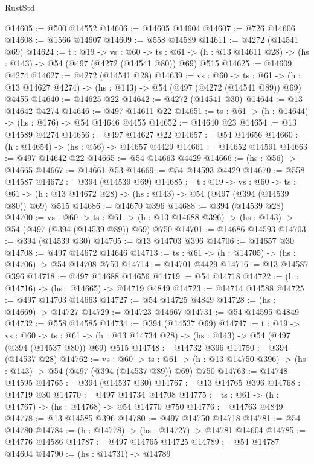\begin{lexlean}{RustStd}
\begin{coremodule}
@14605 := @500 @14552
@14606 := @14605 @14604
@14607 := @726 @14606
@14608 := @1566 @14607
@14609 := @558 @14589
@14611 := @4272 (@14541 @69)
@14624 := {t : @19} ->
  {vs : @60} ->
  {ts : @61} -> (h : @13 @14611 @28) -> (hs : @143) -> @54 (@497 (@4272 (@14541 @80)) @69) @515
@14625 := @14609 @4274
@14627 := @4272 (@14541 @28)
@14639 := {vs : @60} ->
  {ts : @61} -> (h : @13 @14627 @4274) -> (hs : @143) -> @54 (@497 (@4272 (@14541 @89)) @69) @4455
@14640 := @14625 @22
@14642 := @4272 (@14541 @30)
@14644 := @13 @14642 @4274
@14646 := @497 @14611 @22
@14651 := {ts : @61} -> (h : @14644) -> (hs : @176) -> @54 @14646 @4455
@14652 := @14640 @23
@14654 := @13 @14589 @4274
@14656 := @497 @14627 @22
@14657 := @54 @14656
@14660 := (h : @14654) -> (hs : @56) -> @14657 @4429
@14661 := @14652 @14591
@14663 := @497 @14642 @22
@14665 := @54 @14663 @4429
@14666 := (hs : @56) -> @14665
@14667 := @14661 @53
@14669 := @54 @14593 @4429
@14670 := @558 @14587
@14672 := @394 (@14539 @69)
@14685 := {t : @19} ->
  {vs : @60} ->
  {ts : @61} -> (h : @13 @14672 @28) -> (hs : @143) -> @54 (@497 (@394 (@14539 @80)) @69) @515
@14686 := @14670 @396
@14688 := @394 (@14539 @28)
@14700 := {vs : @60} ->
  {ts : @61} -> (h : @13 @14688 @396) -> (hs : @143) -> @54 (@497 (@394 (@14539 @89)) @69) @750
@14701 := @14686 @14593
@14703 := @394 (@14539 @30)
@14705 := @13 @14703 @396
@14706 := @14657 @30
@14708 := @497 @14672 @14646
@14713 := {ts : @61} -> (h : @14705) -> (hs : @14706) -> @54 @14708 @750
@14714 := @14701 @4429
@14716 := @13 @14587 @396
@14718 := @497 @14688 @14656
@14719 := @54 @14718
@14722 := (h : @14716) -> (hs : @14665) -> @14719 @4849
@14723 := @14714 @14588
@14725 := @497 @14703 @14663
@14727 := @54 @14725 @4849
@14728 := (hs : @14669) -> @14727
@14729 := @14723 @14667
@14731 := @54 @14595 @4849
@14732 := @558 @14585
@14734 := @394 (@14537 @69)
@14747 := {t : @19} ->
  {vs : @60} ->
  {ts : @61} -> (h : @13 @14734 @28) -> (hs : @143) -> @54 (@497 (@394 (@14537 @80)) @69) @515
@14748 := @14732 @396
@14750 := @394 (@14537 @28)
@14762 := {vs : @60} ->
  {ts : @61} -> (h : @13 @14750 @396) -> (hs : @143) -> @54 (@497 (@394 (@14537 @89)) @69) @750
@14763 := @14748 @14595
@14765 := @394 (@14537 @30)
@14767 := @13 @14765 @396
@14768 := @14719 @30
@14770 := @497 @14734 @14708
@14775 := {ts : @61} -> (h : @14767) -> (hs : @14768) -> @54 @14770 @750
@14776 := @14763 @4849
@14778 := @13 @14585 @396
@14780 := @497 @14750 @14718
@14781 := @54 @14780
@14784 := (h : @14778) -> (hs : @14727) -> @14781 @14604
@14785 := @14776 @14586
@14787 := @497 @14765 @14725
@14789 := @54 @14787 @14604
@14790 := (hs : @14731) -> @14789

\end{coremodule}
\end{lexlean}
